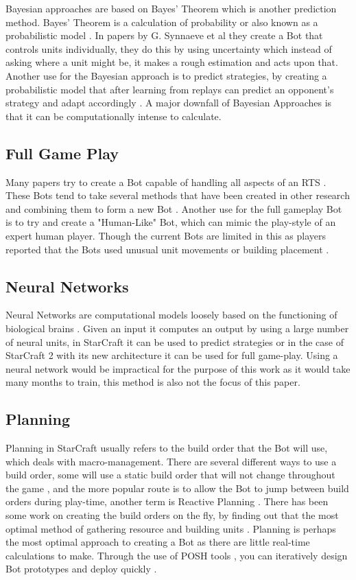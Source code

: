\documentclass[journal]{IEEEtran}
\begin{document}
	Bayesian approaches are based on Bayes' Theorem which is another prediction method. Bayes' Theorem is a calculation of probability or also known as a probabilistic model \cite{BayesianAI}. In papers by G. Synnaeve et al \cite{UnitsControl,SpecialTactics} they create a Bot that controls units individually, they do this by using uncertainty which instead of asking where a unit might be, it makes a rough estimation and acts upon that. Another use for the Bayesian approach is to predict strategies, by creating a probabilistic model that after learning from replays can predict an opponent's strategy and adapt accordingly \cite{Bayesian}. A major downfall of Bayesian Approaches is that it can be computationally intense to calculate.
	
	\subsection{Full Game Play}
	Many papers try to create a Bot capable of handling all aspects of an RTS \cite{Agents,Hierarchical,HumanLevel,SCAIL}. These Bots tend to take several methods that have been created in other research and combining them to form a new Bot \cite{Agents}. Another use for the full gameplay Bot is to try and create a "Human-Like" Bot, which can mimic the play-style of an expert human player. Though the current Bots are limited in this as players reported that the Bots used unusual unit movements or building placement \cite{EvalHuman}.
	
	\subsection{Neural Networks}
	Neural Networks are computational models loosely based on the functioning of biological brains \cite{Deep}. Given an input it computes an output by using a large number of neural units, in StarCraft it can be used to predict strategies or in the case of StarCraft 2 with its new architecture it can be used for full game-play. Using a neural network would be impractical for the purpose of this work as it would take many months to train, this method is also not the focus of this paper.
	
	\subsection{Planning}
	Planning in StarCraft usually refers to the build order that the Bot will use, which deals with macro-management. There are several different ways to use a build order, some will use a static build order that will not change throughout the game \cite{Swen}, and the more popular route is to allow the Bot to jump between build orders during play-time, another term is Reactive Planning \cite{Fuzzy,OnlineEvo,GoalDriven}. There has been some work on creating the build orders on the fly, by finding out that the most optimal method of gathering resource and building units \cite{BuildOrder}. Planning is perhaps the most optimal approach to creating a Bot as there are little real-time calculations to make. Through the use of POSH tools \cite{POSH}, you can iteratively design Bot prototypes and deploy quickly \cite{Swen}. 
	
\end{document}
